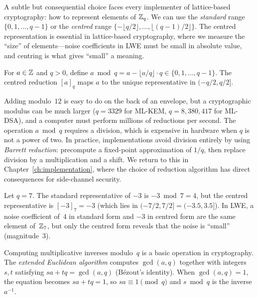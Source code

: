 A subtle but consequential choice faces every implementer of lattice-based cryptography: how to represent elements of $\mathbb{Z}_q$.  We can use the \emph{standard} range $\{0, 1, \ldots, q-1\}$ or the \emph{centred} range $\{-\lfloor q/2 \rfloor, \ldots, \lfloor (q-1)/2 \rfloor\}$.  The centred representation is essential in lattice-based cryptography, where we measure the ``size'' of elements---noise coefficients in LWE must be small in absolute value, and centring is what gives ``small'' a meaning.

\begin{definition}
\label{def:mod-reduction}
For $a \in \mathbb{Z}$ and $q > 0$, define $a \bmod q = a - \lfloor a/q \rfloor \cdot q \in \{0, 1, \ldots, q-1\}$.  The centred reduction $[a]_q$ maps $a$ to the unique representative in $(-q/2, q/2]$.
\end{definition}

Adding modulo~$12$ is easy to do on the back of an envelope, but a cryptographic modulus can be much larger ($q = 3329$ for ML-KEM, $q = 8{,}380{,}417$ for ML-DSA), and a computer must perform millions of reductions per second.  The operation $a \bmod q$ requires a division, which is expensive in hardware when $q$ is not a power of two.  In practice, implementations avoid division entirely by using \emph{Barrett reduction}: precompute a fixed-point approximation of $1/q$, then replace division by a multiplication and a shift.  We return to this in Chapter~\ref{ch:implementation}, where the choice of reduction algorithm has direct consequences for side-channel security.

\begin{example}
\label{ex:centred-reduction}
Let $q = 7$.  The standard representative of $-3$ is $-3 \bmod 7 = 4$, but the centred representative is $[-3]_7 = -3$ (which lies in $(-7/2, 7/2] = (-3.5, 3.5]$).  In LWE, a noise coefficient of~$4$ in standard form and $-3$ in centred form are the same element of~$\mathbb{Z}_7$, but only the centred form reveals that the noise is ``small'' (magnitude~$3$).
\end{example}

Computing multiplicative inverses modulo~$q$ is a basic operation in cryptography.  The \emph{extended Euclidean algorithm} computes $\gcd(a, q)$ together with integers $s, t$ satisfying $sa + tq = \gcd(a,q)$ (B\'ezout's identity).  When $\gcd(a,q) = 1$, the equation becomes $sa + tq = 1$, so $sa \equiv 1 \pmod{q}$ and $s \bmod q$ is the inverse $a^{-1}$.

